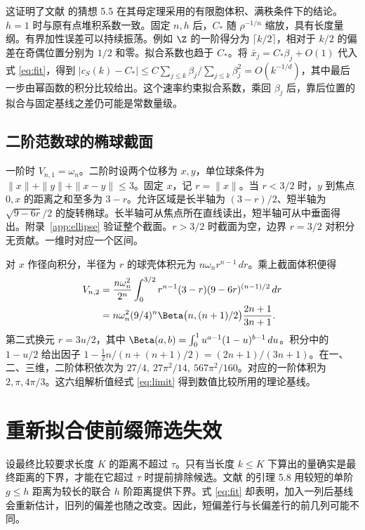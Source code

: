 \documentclass[11pt,a4paper,UTF8,fontset=fandol]{ctexart}
\theoremstyle{definition}
\begin{document}
这证明了文献 \cite{wkhigher} 的猜想 5.5 在其母定理采用的有限胞体积、满秩条件下的结论。\(h=1\) 时与原有点堆积系数一致。固定 \(n,h\) 后，\(C_*\) 随 \(\rho^{-1/n}\) 缩放，具有长度量纲。有界加性误差可以持续振荡。例如 \(\Z\) 的一阶得分为 \(\lceil k/2\rceil\)，相对于 \(k/2\) 的偏差在奇偶位置分别为 \(1/2\) 和零。拟合系数也趋于 \(C_*\)。将 \(\bar x_j=C_*\beta_j+O(1)\) 代入式 \eqref{eq:fit}，得到 \(|c_S(k)-C_*|\le C\sum_{j\le k}\beta_j/\sum_{j\le k}\beta_j^2=O(k^{-1/d})\)，其中最后一步由幂函数的积分比较给出。这个速率约束拟合系数，乘回 \(\beta_j\) 后，靠后位置的拟合与固定基线之差仍可能是常数量级。

\subsection{二阶范数球的椭球截面}

一阶时 \(V_{n,1}=\omega_n\)。二阶时设两个位移为 \(x,y\)，单位球条件为 \(\|x\|+\|y\|+\|x-y\|\le3\)。固定 \(x\)，记 \(r=\|x\|\)。当 \(r<3/2\) 时，\(y\) 到焦点 \(0,x\) 的距离之和至多为 \(3-r\)。允许区域是长半轴为 \((3-r)/2\)、短半轴为 \(\sqrt{9-6r}/2\) 的旋转椭球。长半轴可从焦点所在直线读出，短半轴可从中垂面得出。附录~\ref{app:ellipse} 验证整个截面。\(r>3/2\) 时截面为空，边界 \(r=3/2\) 对积分无贡献。一维时对应一个区间。

对 \(x\) 作径向积分，半径为 \(r\) 的球壳体积元为 \(n\omega_n r^{n-1}\,dr\)。乘上截面体积便得
\begin{equation}\label{eq:volume}
\begin{aligned}
V_{n,2}
 &=\frac{n\omega_n^2}{2^n}
 \int_0^{3/2}r^{n-1}(3-r)(9-6r)^{(n-1)/2}\,dr\\
 &=n\omega_n^2(9/4)^n
 \Beta\bigl(n,(n+1)/2\bigr)\frac{2n+1}{3n+1}.
\end{aligned}
\end{equation}
第二式换元 \(r=3u/2\)，其中 \(\Beta(a,b)=\int_0^1u^{a-1}(1-u)^{b-1}\,du\)。积分中的 \(1-u/2\) 给出因子 \(1-\tfrac12 n/(n+(n+1)/2)=(2n+1)/(3n+1)\)。在一、二、三维，二阶体积依次为 \(27/4,\ 27\pi^2/14,\ 567\pi^2/160\)。对应的一阶体积为 \(2,\pi,4\pi/3\)。这六组解析值经式 \eqref{eq:limit} 得到数值比较所用的理论基线。

\section{重新拟合使前缀筛选失效}\label{sec:counter}

设最终比较要求长度 \(K\) 的距离不超过 \(\tau\)。只有当长度 \(k\le K\) 下算出的量确实是最终距离的下界，才能在它超过 \(\tau\) 时提前排除候选。文献 \cite{wkhigher} 的引理 5.8 用较短的单阶 \(g\le h\) 距离为较长的联合 \(h\) 阶距离提供下界。式 \eqref{eq:fit} 却表明，加入一列后基线会重新估计，旧列的偏差也随之改变。因此，短偏差行与长偏差行的前几列可能不同。
\end{document}
